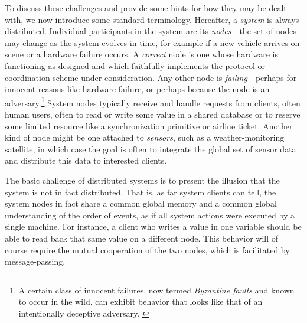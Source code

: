 To discuss these challenges and provide some hints for how they may be dealt with,
we now introduce some standard terminology. Hereafter, a \emph{system} is
always distributed. Individual participants in the system are its
\emph{nodes}---the set of nodes may change as the system evolves in time, for example if a new vehicle arrives on scene or a hardware failure occurs. A
\emph{correct} node is one whose hardware is functioning as designed and which
faithfully implements the protocol or coordination scheme under consideration.
Any other node is \emph{failing}---perhaps for innocent reasons like hardware
failure, or perhaps because the node is an adversary.\footnote{A certain class
of innocent failures, now termed \emph{Byzantine faults} and known to occur in
the wild, can exhibit behavior that looks like that of an intentionally
deceptive adversary. \cite{1979Sift}} System nodes typically receive and handle
requests from clients, often human users, often to read or write some value in a
shared database or to reserve some limited resource like a synchronization
primitive or airline ticket. Another kind of node might be one attached to
\emph{sensors}, such as a weather-monitoring satellite, in which case the goal
is often to integrate the global set of sensor data and distribute this data to
interested clients.

The basic challenge of distributed systems is to present the illusion that the system is not in fact distributed. That is, as far system clients can tell, the system nodes in fact share a common global memory and a common global understanding of the order of events, as if all system actions were executed by a single machine. For instance, a client who writes a value in one variable should be able to read back that same value on a different node. This behavior will of course require the mutual cooperation of the two nodes, which is facilitated by message-passing.
